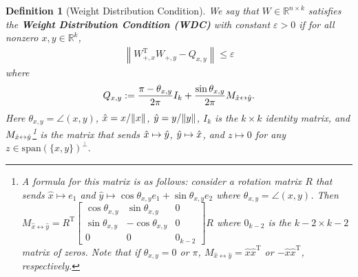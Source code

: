 \documentclass[11pt]{article}
\renewcommand{\epsilon}{\varepsilon}
\newcommand{\R}{\mathbb{R}}
\newcommand{\E}{\operatorname{\mathbb{E}}}
\renewcommand{\top}{{\mathrm{T}}}
\newtheorem{lem}{Lemma}
\newtheorem{defn}[thm]{Definition}
\theoremstyle{remark}
\begin{document}
\begin{defn}[Weight Distribution Condition]  We say that $W \in \R^{n \times k}$ satisfies the \textbf{Weight Distribution Condition (WDC)} with constant $\epsilon > 0$ if for all nonzero $x,y \in \R^k$, \begin{align}
    \left\| W_{+,x}^\top W_{+,y} - Q_{x,y} \right\| \leqslant \epsilon \nonumber
\end{align} where \begin{align}
    Q_{x,y} := \frac{\pi - \theta_{x,y}}{2\pi} I_k + \frac{\sin \theta_{x,y}}{2\pi} M_{\hat{x}\leftrightarrow \Hat{y}}. \label{Qdef}
\end{align} Here $\theta_{x,y} = \angle(x,y)$, $\Hat{x} = x/\|x\|$, $\Hat{y} = y/\|y\|$, $I_k$ is the $k \times k$ identity matrix, and $M_{\hat{x}\leftrightarrow \Hat{y}}$\footnote{A formula for this matrix is as follows: consider a rotation matrix $R$ that sends $\hat{x} \mapsto e_1$ and $\hat{y} \mapsto \cos\theta_{x,y} e_1 + \sin\theta_{x,y} e_2$ where $\theta_{x,y} = \angle(x,y)$. Then $M_{\hat{x} \leftrightarrow \hat{y}} = R^\top \left[\begin{array}{ccc}
    \cos\theta_{x,y} & \sin\theta_{x,y} & 0  \\
     \sin \theta_{x,y} & -\cos \theta_{x,y} & 0 \\
     0 & 0 & 0_{k-2}
\end{array}\right]R$ where $0_{k-2}$ is the $k-2 \times k-2$ matrix of zeros. Note that if $\theta_{x,y} = 0$ or $\pi$, $M_{\hat{x} \leftrightarrow \hat{y}} = \hat{x}\hat{x}^\top$ or $-\hat{x}\hat{x}^\top$, respectively.} is the matrix that sends $\Hat{x} \mapsto \Hat{y}$, $\Hat{y} \mapsto \Hat{x}$, and $z \mapsto 0$ for any $z \in \text{span}(\{x,y\})^{\perp}.$
\end{defn}  %
\end{document}
